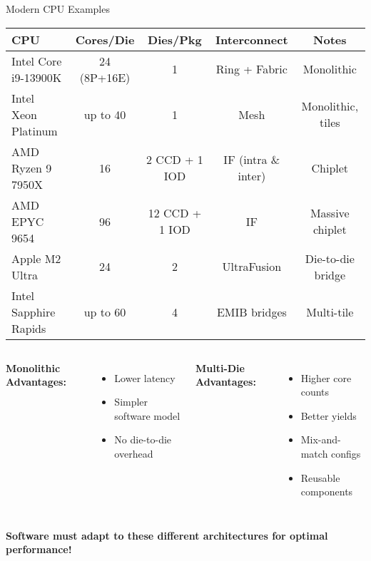 \documentclass[aspectratio=169,12pt]{beamer}
\begin{document}
\begin{frame}{Modern CPU Examples}
\begin{center}
\small
\begin{tabular}{l|c|c|c|c}
\toprule
\textbf{CPU} & \textbf{Cores/Die} & \textbf{Dies/Pkg} & \textbf{Interconnect} & \textbf{Notes} \\
\midrule
Intel Core i9-13900K & 24 (8P+16E) & 1 & Ring + Fabric & Monolithic \\
Intel Xeon Platinum & up to 40 & 1 & Mesh & Monolithic, tiles \\
\midrule
AMD Ryzen 9 7950X & 16 & 2 CCD + 1 IOD & IF (intra \& inter) & Chiplet \\
AMD EPYC 9654 & 96 & 12 CCD + 1 IOD & IF & Massive chiplet \\
\midrule
Apple M2 Ultra & 24 & 2 & UltraFusion & Die-to-die bridge \\
\midrule
Intel Sapphire Rapids & up to 60 & 4 & EMIB bridges & Multi-tile \\
\bottomrule
\end{tabular}
\end{center}

\vspace{0.5cm}
\begin{columns}[T]
\textbf{Monolithic Advantages:}
\begin{itemize}
\item Lower latency
\item Simpler software model
\item No die-to-die overhead
\end{itemize}

\textbf{Multi-Die Advantages:}
\begin{itemize}
\item Higher core counts
\item Better yields
\item Mix-and-match configs
\item Reusable components
\end{itemize}
\end{columns}

\vspace{0.3cm}
\textbf{Software must adapt to these different architectures for optimal performance!}
\end{frame}
\end{document}
